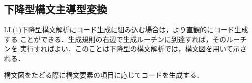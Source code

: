 \documentclass[dvipdfmx,a4j]{jbook}
\begin{document}





\subsection{下降型構文主導型変換}

LL(1)下降型構文解析にコード生成に組み込む場合は，より直観的にコード生成する
ことができる．生成規則の右辺で生成ルーチンに到達すれば，そのルーチンを
実行すればよい．このことは下降型の構文解析では，構文図を用いて示される．

構文図をたどる際に構文要素の項目に応じてコードを生成する．
\end{document}
